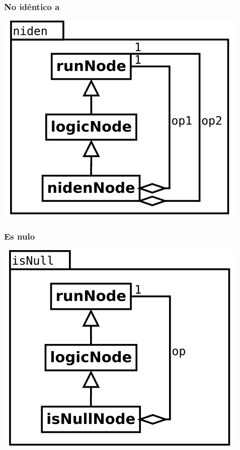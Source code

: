 \subsubsection {No idéntico a}
\begin{center}
\includegraphics[scale=0.4]{niden.png} \\
\end{center}

\subsubsection {Es nulo}
\begin{center}
\includegraphics[scale=0.4]{isNull.png} \\
\end{center}

